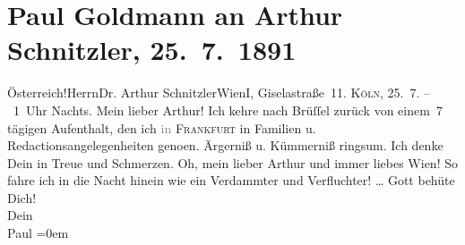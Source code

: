 

         \renewcommand{\erwaehnteOrte}{Orte: Brüssel, Bösendorferstraße, Frankfurt am Main, I., Innere Stadt, Köln, Wien, Österreich}
         \renewcommand{\erwaehnteWerke}{}
               \section[Paul Goldmann an Arthur Schnitzler, 25. 7. 1891]{ Paul Goldmann an Arthur Schnitzler, 25. 7. 1891}\nopagebreak{}\rehead{ }\begin{ledgroupsized}[t]{13cm}\normalsize\beginnumbering \toendnotes[C]{\smallbreak\pagebreak[2]} 
\toendnotes[C]{\smallbreak}\pstart{}{\pb}Österreich!\pend{}\pstart{}Herrn\pend{}\pstart{}Dr. Arthur Schnitzler\pend{}\pstart{}Wien\pend{}\pstart{}I, Giselastraße 11.\pend{}{\bigskip}\pstart
           \noindent{}{\pb}\textsc{Köln}, 25. 7. – 1 Uhr Nachts. Mein lieber Arthur! Ich kehre nach Brüſſel zurück von einem 7 tägigen Aufenthalt, den ich
                  \textcolor{gray}{in}{ }\textsc{Frankfurt} in Familien u. Redactionsangelegenheiten geno{\geminationm}en.
               Ärgerniß u. Kümmerniß ringsum. Ich denke Dein in Treue und Schmerzen. Oh, mein lieber
               Arthur und immer liebes Wien! So fahre ich in die
               Nacht hinein wie ein Verdammter und Verfluchter! {\dots}\pend
           \pstart
           Gott behüte Dich!{\\[\baselineskip]}Dein {\\[\baselineskip]}\spacefill\mbox{Paul}\pend
           \leftskip=0em{}\pstart
           \noindent{}\label{T_L02667-1v}\label{T_L02667-1h}\pend
           
         
         \endnumbering{}\end{ledgroupsized}  \newcommand{\dateiname}{L02667}\newcommand{\titel}{Paul Goldmann an Arthur Schnitzler, 25. 7. 1891}\newcommand{\editorInnen}{Martin Anton Müller und Laura Untner}
      